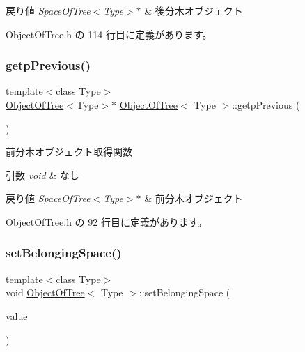 \begin{DoxyRetVals}{戻り値}
{\em Space\+Of\+Tree$<$\+Type$>$$\ast$} & 後分木オブジェクト \\
\hline
\end{DoxyRetVals}


 Object\+Of\+Tree.\+h の 114 行目に定義があります。

\mbox{\label{class_object_of_tree_abdacc480e98a4dbaff33b13faf2d9ab4}} 
\subsubsection{\texorpdfstring{getp\+Previous()}{getpPrevious()}}
{\footnotesize\ttfamily template$<$class Type$>$ \\
\mbox{\hyperlink{class_object_of_tree}{Object\+Of\+Tree}}$<$Type$>$$\ast$ \mbox{\hyperlink{class_object_of_tree}{Object\+Of\+Tree}}$<$ Type $>$\+::getp\+Previous (\begin{DoxyParamCaption}{ }\end{DoxyParamCaption})\hspace{0.3cm}{\ttfamily [inline]}}



前分木オブジェクト取得関数 


\begin{DoxyParams}{引数}
{\em void} & なし \\
\hline
\end{DoxyParams}

\begin{DoxyRetVals}{戻り値}
{\em Space\+Of\+Tree$<$\+Type$>$$\ast$} & 前分木オブジェクト \\
\hline
\end{DoxyRetVals}


 Object\+Of\+Tree.\+h の 92 行目に定義があります。

\mbox{\label{class_object_of_tree_a21dc9105d1a5a0d045dc43894bba3c1c}} 
\subsubsection{\texorpdfstring{set\+Belonging\+Space()}{setBelongingSpace()}}
{\footnotesize\ttfamily template$<$class Type$>$ \\
void \mbox{\hyperlink{class_object_of_tree}{Object\+Of\+Tree}}$<$ Type $>$\+::set\+Belonging\+Space (\begin{DoxyParamCaption}\item[{\mbox{\hyperlink{class_space_of_tree}{Space\+Of\+Tree}}$<$ Type $>$ $\ast$}]{value }\end{DoxyParamCaption})\hspace{0.3cm}{\ttfamily [inline]}}



